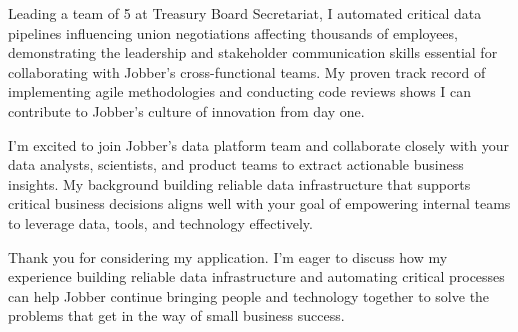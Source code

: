 \documentclass[11pt, letterpaper]{awesome-cv}
\begin{document}
\begin{cvletter}
Leading a team of 5 at Treasury Board Secretariat, I automated critical data pipelines influencing union negotiations affecting thousands of employees, demonstrating the leadership and stakeholder communication skills essential for collaborating with Jobber's cross-functional teams. My proven track record of implementing agile methodologies and conducting code reviews shows I can contribute to Jobber's culture of innovation from day one.

I'm excited to join Jobber's data platform team and collaborate closely with your data analysts, scientists, and product teams to extract actionable business insights. My background building reliable data infrastructure that supports critical business decisions aligns well with your goal of empowering internal teams to leverage data, tools, and technology effectively.

Thank you for considering my application. I'm eager to discuss how my experience building reliable data infrastructure and automating critical processes can help Jobber continue bringing people and technology together to solve the problems that get in the way of small business success.
\end{cvletter}


\makeletterclosing%
\end{document}
